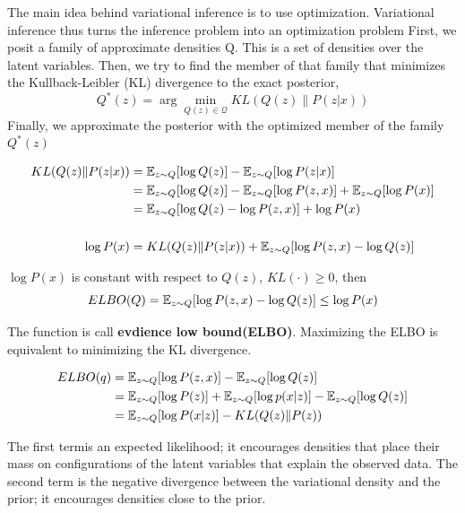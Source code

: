 The main idea behind variational inference is to use optimization. Variational inference thus turns the
inference problem into an optimization problem
First, we posit a family of approximate densities Q. This is a set of densities over the latent
variables. Then, we try to find the member of that family that minimizes the Kullback-Leibler
(KL) divergence to the exact posterior,
\begin{equation}
    Q^*(z) = \arg \min_{Q(z) \in \mathcal{Q}} KL(Q(z)\|P(z|x))
\end{equation}
Finally, we approximate the posterior with the optimized member of the family $Q^*(z)$

\begin{equation}
    \begin{split}
        KL(Q(z)\|P(z|x))
        &= \mathbb{E}_{z \sim Q} [\log Q(z)] - \mathbb{E}_{z \sim Q} [\log P(z|x)] \\
        &= \mathbb{E}_{z \sim Q} [\log Q(z)] - \mathbb{E}_{z \sim Q} [\log P(z, x)] + \mathbb{E}_{z \sim Q}[\log P(x)]\\
        &= \mathbb{E}_{z \sim Q} [\log Q(z) - \log P(z, x)] + \log P(x) \\
        \\
        \log P(x)
        &= KL(Q(z)\|P(z|x)) + \mathbb{E}_{z \sim Q} [\log P(z, x) - \log Q(z)]
    \end{split}
\end{equation}

$\log P(x)$ is constant with respect to $Q(z)$, $KL(\cdot ) \ge 0$, then
\begin{equation}
    ELBO(Q) = \mathbb{E}_{z \sim Q} [\log P(z, x) - \log Q(z)] \le \log P(x)
\end{equation}

The function is call \textbf{evdience low bound(ELBO)}. Maximizing the ELBO is equivalent to
minimizing the KL divergence.

\begin{equation}
    \begin{split}
        ELBO(q)
        &= \mathbb{E}_{z \sim Q} [\log P(z, x)] - \mathbb{E}_{z \sim Q} [\log Q(z)] \\
        &= \mathbb{E}_{z \sim Q} [\log P(z)] + \mathbb{E}_{z \sim Q} [\log p(x|z)] - \mathbb{E}_{z \sim Q} [\log Q(z)] \\
        &= \mathbb{E}_{z \sim Q} [\log P(x|z)] - KL(Q(z)\|P(z))
    \end{split}
\end{equation}

The first termis an expected likelihood; it encourages densities
that place their mass on configurations of the latent variables
that explain the observed data. The second term is the negative
divergence between the variational density and the prior; it encourages
densities close to the prior.

